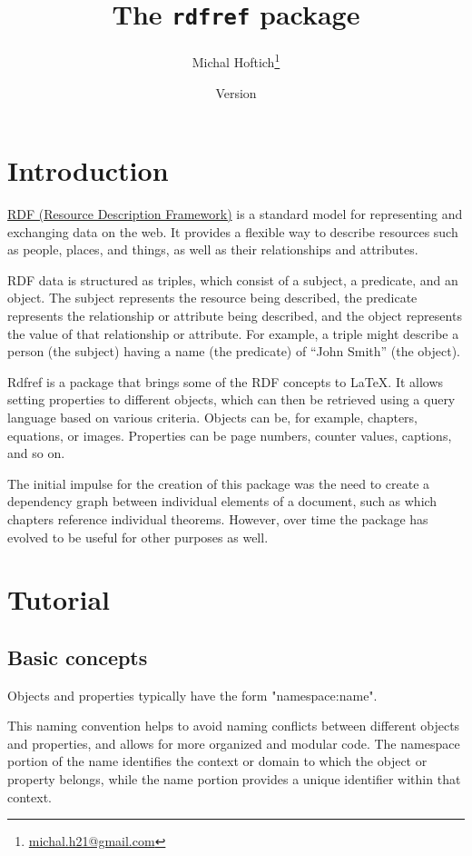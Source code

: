 \documentclass{ltxdoc}
\title{The \texttt{rdfref} package}
\author{Michal Hoftich\footnote{\url{michal.h21@gmail.com}}}
\date{Version \version\\\gitdate}
\begin{document}
\maketitle
\tableofcontents

\section{Introduction}

\href{https://en.wikipedia.org/wiki/Resource_Description_Framework}{RDF (Resource Description Framework)}
is a standard model for representing and
exchanging data on the web. It provides a flexible way to describe resources
such as people, places, and things, as well as their relationships and
attributes.

RDF data is structured as triples, which consist of a subject, a predicate, and
an object. The subject represents the resource being described, the predicate
represents the relationship or attribute being described, and the object
represents the value of that relationship or attribute. For example, a triple
might describe a person (the subject) having a name (the predicate) of \enquote{John
Smith} (the object).

Rdfref is a package that brings some of the RDF concepts to \LaTeX. It allows
setting properties to different objects, which can then be retrieved using a
query language based on various criteria. Objects can be, for example,
chapters, equations, or images. Properties can be page numbers, counter values,
captions, and so on.

The initial impulse for the creation of this package was the need to create a
dependency graph between individual elements of a document, such as which
chapters reference individual theorems. However, over time the package has
evolved to be useful for other purposes as well.

\section{Tutorial}


\subsection{Basic concepts}

Objects and properties typically have the form "namespace:name".

This naming convention helps to avoid naming conflicts between different
objects and properties, and allows for more organized and modular code. The
namespace portion of the name identifies the context or domain to which the
object or property belongs, while the name portion provides a unique identifier
within that context.
\end{document}
